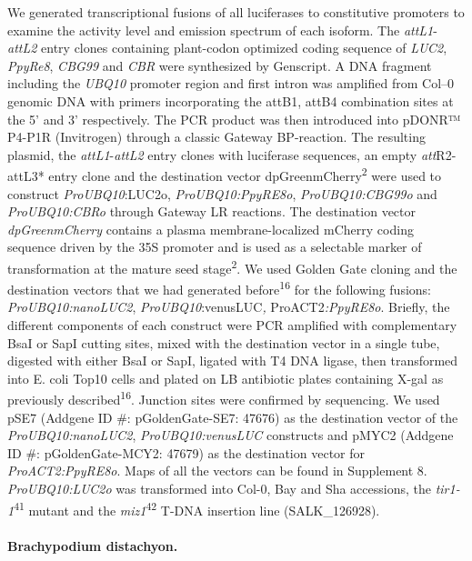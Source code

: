 \documentclass[]{article}
\begin{document}
We generated transcriptional fusions of all luciferases to constitutive
promoters to examine the activity level and emission spectrum of each
isoform. The \emph{attL1}-\emph{attL2} entry clones containing
plant-codon optimized coding sequence of \emph{LUC2}, \emph{PpyRe8},
\emph{CBG99} and \emph{CBR} were synthesized by Genscript. A DNA
fragment including the \emph{UBQ10} promoter region and first intron was
amplified from Col--0 genomic DNA with primers incorporating the attB1,
attB4 combination sites at the 5' and 3' respectively. The PCR product
was then introduced into pDONR™ P4-P1R (Invitrogen) through a classic
Gateway BP-reaction. The resulting plasmid, the
\emph{attL1}-\emph{attL2} entry clones with luciferase sequences, an
empty \emph{att}R2-attL3* entry clone and the destination vector
dpGreenmCherry\textsuperscript{2} were used to construct
\emph{ProUBQ10}:LUC2o, \emph{ProUBQ10:PpyRE8o}, \emph{ProUBQ10:CBG99o}
and \emph{ProUBQ10:CBRo} through Gateway LR reactions. The destination
vector \emph{dpGreenmCherry} contains a plasma membrane-localized
mCherry coding sequence driven by the 35S promoter and is used as a
selectable marker of transformation at the mature seed
stage\textsuperscript{2}. We used Golden Gate cloning and the
destination vectors that we had generated before\textsuperscript{16} for
the following fusions: \emph{ProUBQ10:nanoLUC2},
\emph{ProUBQ10}:venusLUC\emph{, }ProACT2\emph{:PpyRE8o}. Briefly, the
different components of each construct were PCR amplified with
complementary BsaI or SapI cutting sites, mixed with the destination
vector in a single tube, digested with either BsaI or SapI, ligated with
T4 DNA ligase, then transformed into E. coli Top10 cells and plated on
LB antibiotic plates containing X-gal as previously
described\textsuperscript{16}. Junction sites were confirmed by
sequencing. We used pSE7 (Addgene ID \#: pGoldenGate-SE7: 47676) as the
destination vector of the \emph{ProUBQ10:nanoLUC2},
\emph{ProUBQ10:venusLUC} constructs and pMYC2 (Addgene ID \#:
pGoldenGate-MCY2: 47679) as the destination vector for
\emph{ProACT2:PpyRE8o}. Maps of all the vectors can be found in
Supplement 8. \emph{ProUBQ10:LUC2o} was transformed into Col-0, Bay and
Sha accessions, the \emph{tir1-1}\textsuperscript{41} mutant and the
\emph{miz1}\textsuperscript{42} T-DNA insertion line (SALK\_126928).

\paragraph{Brachypodium distachyon.}\label{brachypodium-distachyon.}
\end{document}
